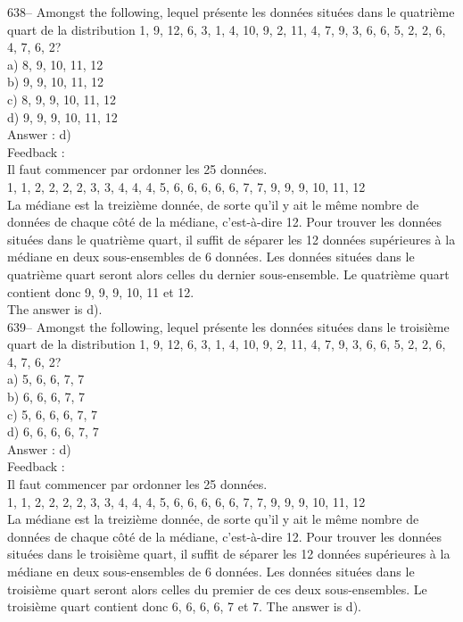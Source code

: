﻿\documentclass[letterpaper, 12pt]{article}
\begin{document}
638--  Amongst the following, lequel pr\'esente les donn\'ees
situ\'ees dans le quatri\`eme quart de la distribution 1, 9, 12, 6, 3, 1, 4,
10, 9, 2, 11, 4, 7, 9, 3, 6, 6, 5, 2, 2, 6, 4, 7, 6, 2?\\
a) 8, 9, 10, 11, 12\\
b) 9, 9, 10, 11, 12\\
c) 8, 9, 9, 10, 11, 12\\
d) 9, 9, 9, 10, 11, 12\\

Answer : d)\\

Feedback : \\
Il faut commencer par ordonner les 25 donn\'ees.\\
1, 1, 2, 2, 2, 2, 3, 3, 4, 4, 4, 5, 6, 6, 6, 6, 6, 7, 7, 9, 9, 9, 10, 11,
12\\
La m\'ediane est la treizi\`eme donn\'ee, de sorte qu'il y ait le m\^eme
nombre de donn\'ees de chaque c\^ot\'e de la m\'ediane, c'est-\`a-dire 12.
Pour trouver les donn\'ees situ\'ees dans le quatri\`eme quart, il suffit de
s\'eparer les 12 donn\'ees sup\'erieures \`a la m\'ediane en deux
sous-ensembles de 6 donn\'ees.  Les donn\'ees situ\'ees dans le quatri\`eme
quart seront alors celles du dernier sous-ensemble. Le quatri\`eme quart
contient donc 9, 9, 9, 10, 11 et 12.\\
The answer is d). \\

639-- Amongst the following, lequel pr\'esente les donn\'ees
situ\'ees dans le troisi\`eme quart de la distribution 1, 9, 12, 6, 3, 1, 4,
10, 9, 2, 11, 4, 7, 9, 3, 6, 6, 5, 2, 2, 6, 4, 7, 6, 2?\\
a) 5, 6, 6, 7, 7\\
b) 6, 6, 6, 7, 7\\
c) 5, 6, 6, 6, 7, 7\\
d) 6, 6, 6, 6, 7, 7\\

Answer : d)\\

Feedback : \\
Il faut commencer par ordonner les 25 donn\'ees.\\
1, 1, 2, 2, 2, 2, 3, 3, 4, 4, 4, 5, 6, 6, 6, 6, 6, 7, 7, 9, 9, 9, 10, 11,
12\\
La m\'ediane est la treizi\`eme donn\'ee, de sorte qu'il y ait le m\^eme
nombre de donn\'ees de chaque c\^ot\'e de la m\'ediane, c'est-\`a-dire 12.
Pour trouver les donn\'ees situ\'ees dans le troisi\`eme quart, il suffit de
s\'eparer les 12 donn\'ees sup\'erieures \`a la m\'ediane en deux
sous-ensembles de 6 donn\'ees.  Les donn\'ees situ\'ees dans le troisi\`eme
quart seront alors celles du premier de ces deux sous-ensembles.  Le
troisi\`eme quart contient donc 6, 6, 6, 6, 7 et 7.  The answer is d). \\
\end{document}
